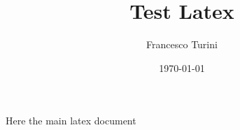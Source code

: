 \documentclass{article}
\title{Test Latex}
\author{Francesco Turini}
\date{\today}
\begin{document}
\maketitle

Here the main latex document \cite{test}
\printbibliography
\end{document}

